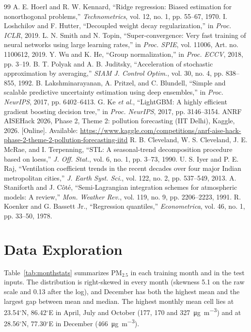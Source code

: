 \documentclass[journal]{IEEEtran}
\newcommand{\ugm}{\si{\micro\gram\per\cubic\metre}}
\newcommand{\PM}{PM$_{2.5}$}
\begin{document}
\begin{thebibliography}{99}
 A. E. Hoerl and R. W. Kennard, ``Ridge regression: Biased estimation for nonorthogonal problems,'' \emph{Technometrics}, vol. 12, no. 1, pp. 55--67, 1970.
 I. Loshchilov and F. Hutter, ``Decoupled weight decay regularization,'' in \emph{Proc. ICLR}, 2019.
 L. N. Smith and N. Topin, ``Super-convergence: Very fast training of neural networks using large learning rates,'' in \emph{Proc. SPIE}, vol. 11006, Art. no. 1100612, 2019.
 Y. Wu and K. He, ``Group normalization,'' in \emph{Proc. ECCV}, 2018, pp. 3--19.
 B. T. Polyak and A. B. Juditsky, ``Acceleration of stochastic approximation by averaging,'' \emph{SIAM J. Control Optim.}, vol. 30, no. 4, pp. 838--855, 1992.
 B. Lakshminarayanan, A. Pritzel, and C. Blundell, ``Simple and scalable predictive uncertainty estimation using deep ensembles,'' in \emph{Proc. NeurIPS}, 2017, pp. 6402--6413.
 G. Ke \emph{et al.}, ``LightGBM: A highly efficient gradient boosting decision tree,'' in \emph{Proc. NeurIPS}, 2017, pp. 3146--3154.
 ANRF AISEHack 2026, Phase 2, Theme 2: pollution forecasting (IIT Delhi), Kaggle, 2026. [Online]. Available: \url{https://www.kaggle.com/competitions/anrf-aise-hack-phase-2-theme-2-pollution-forecasting-iitd}
 R. B. Cleveland, W. S. Cleveland, J. E. McRae, and I. Terpenning, ``STL: A seasonal-trend decomposition procedure based on loess,'' \emph{J. Off. Stat.}, vol. 6, no. 1, pp. 3--73, 1990.
 U. S. Iyer and P. E. Raj, ``Ventilation coefficient trends in the recent decades over four major Indian metropolitan cities,'' \emph{J. Earth Syst. Sci.}, vol. 122, no. 2, pp. 537--549, 2013.
 A. Staniforth and J. C\^{o}t\'{e}, ``Semi-Lagrangian integration schemes for atmospheric models: A review,'' \emph{Mon. Weather Rev.}, vol. 119, no. 9, pp. 2206--2223, 1991.
 R. Koenker and G. Bassett Jr., ``Regression quantiles,'' \emph{Econometrica}, vol. 46, no. 1, pp. 33--50, 1978.
\end{thebibliography}

\clearpage
\nobalance
\appendices
\raggedbottom

\section{Data Exploration}
\label{app:eda}
Table~\ref{tab:monthstats} summarizes \PM{} in each training month and in the test inputs. The distribution is right-skewed in every month (skewness 5.1 on the raw scale and 0.13 after the log), and December has both the highest mean and the largest gap between mean and median. The highest monthly mean cell lies at 23.54$^\circ$N, 86.42$^\circ$E in April, July and October (177, 170 and 327~\ugm) and at 28.56$^\circ$N, 77.30$^\circ$E in December (466~\ugm).
\end{document}
